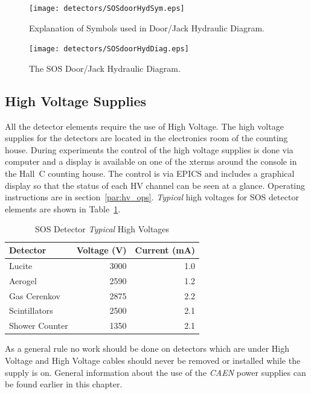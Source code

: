 \begin{figure}
\texttt{[image: detectors/SOSdoorHydSym.eps]}
\caption{Explanation of Symbols used in Door/Jack Hydraulic 
Diagram. \label{fig:SOSdoorHydSym}}
\end{figure}
\clearpage

\begin{figure}
\texttt{[image: detectors/SOSdoorHydDiag.eps]}
\caption{The SOS Door/Jack Hydraulic Diagram. \label{fig:SOSdoorHydDiag}}
\end{figure}
\clearpage


\subsection{High Voltage Supplies }

All the detector elements require the use of High Voltage. The
high voltage supplies for the detectors are located in the 
electronics room of the counting house.
During experiments the control of the high voltage supplies is done via
computer and a display is available on one of the xterms around
the console in the Hall~C counting house. The control is via
EPICS and includes a graphical display so that the status of each
HV channel can be seen at a glance. Operating instructions are
in section~\ref{par:hv_ops}. {\em Typical} high voltages for
SOS detector elements are shown in Table~\ref{tab:sos_hv}.

\begin{table}[!hbt]\centering
   \caption{SOS Detector {\em Typical} High Voltages\label{tab:sos_hv}}
   \begin{tabular}{lrr}
      Detector & Voltage (V) & Current (mA)\\
      \hline
      Lucite         & 3000  & 1.0 \\
      Aerogel        & 2590  & 1.2 \\
      Gas Cerenkov   & 2875  & 2.2 \\
      Scintillators  & 2500  & 2.1 \\
      Shower Counter & 1350  & 2.1 \\
      \hline
   \end{tabular}
\end{table}

As a general rule no work should be done on detectors which are under
High Voltage and
High Voltage cables should never be removed or installed while the supply is on.
General information about the use of the {\em CAEN} power supplies can be
found earlier in this chapter.


